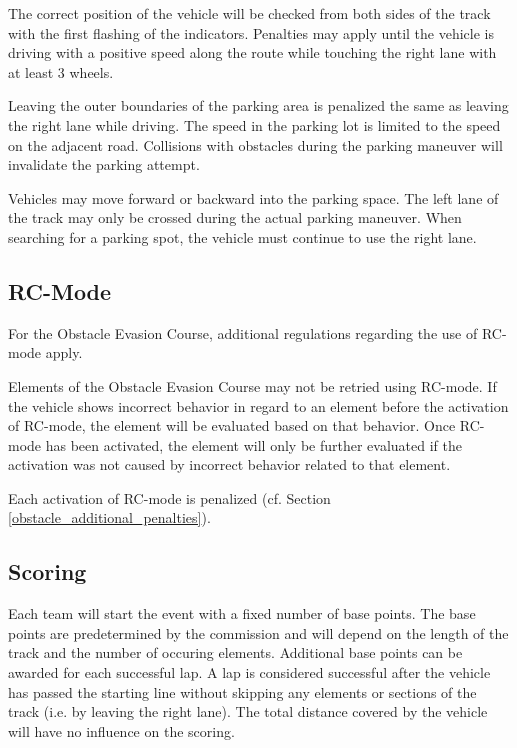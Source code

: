 The correct position of the vehicle will be checked from both sides of the track with the first flashing of the indicators.
Penalties may apply until the vehicle is driving with a positive speed along the route while touching the right lane with at least 3 wheels.

Leaving the outer boundaries of the parking area is penalized the same as leaving the right lane while driving.
The speed in the parking lot is limited to the speed on the adjacent road. Collisions with obstacles during the parking maneuver will invalidate the parking attempt.

Vehicles may move forward or backward into the parking space.
The left lane of the track may only be crossed during the actual parking maneuver.
When searching for a parking spot, the vehicle must continue to use the right lane.

\subsection{RC-Mode}

For the Obstacle Evasion Course, additional regulations regarding the use of RC-mode apply.

Elements of the Obstacle Evasion Course may not be retried using RC-mode.
If the vehicle shows incorrect behavior in regard to an element before the activation of RC-mode, the element will be evaluated based on that behavior.
Once RC-mode has been activated, the element will only be further evaluated if the activation was not caused by incorrect behavior related to that element.

Each activation of RC-mode is penalized (cf. Section \ref{obstacle_additional_penalties}).

\subsection{Scoring}
\label{obstacle_scoring}

\renewcommand*\footnoterule{} %
\newcommand{\topstrut}{\rule{0pt}{3.5ex}}

Each team will start the event with a fixed number of base points.
The base points are predetermined by the commission and will depend on the length of the track and the number of occuring elements.
Additional base points can be awarded for each successful lap.
A lap is considered successful after the vehicle has passed the starting line without skipping any elements or sections of the track (i.e. by leaving the right lane).
The total distance covered by the vehicle will have no influence on the scoring.

